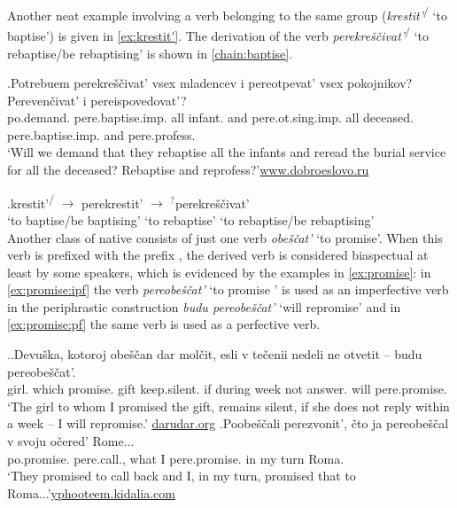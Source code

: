Another neat example involving a verb belonging to the same group (\textit{krestit'}\textsuperscript{\IPF\slash\PF} `to baptise') is given in \ref{ex:krestit'}. The derivation of the verb \textit{perekre\v{s}\v{c}ivat'}\textsuperscript{\IPF\slash\PF} `to rebaptise/be rebaptising' is shown in \ref{chain:baptise}.

\exg.\label{ex:krestit'}Potrebuem perekre\v{s}\v{c}ivat' vsex mladencev i pereotpevat' vsex pokojnikov? Pereven\v{c}ivat' i pereispovedovat'?\\
po.demand. pere.baptise.imp. all infant. and pere.ot.sing.imp. all deceased. pere.baptise.imp. and pere.profess.\\
\trans `Will we demand that they rebaptise all the infants and reread the burial service for all the deceased? Rebaptise and reprofess?'\hbox{}\hfill\hbox{\url{www.dobroeslovo.ru}}


\exg.\label{chain:baptise}krestit'\textsuperscript{\IPF\slash\PF} $\rightarrow$ perekrestit'\textsuperscript{\PF} $\rightarrow$ $^?$perekre\v{s}\v{c}ivat'\textsuperscript{\IPF}\\
{`to baptise/be baptising'} {} {`to rebaptise'} {} {`to rebaptise/be rebaptising'}\\

Another class of native  consists of just one verb \textit{obe\v{s}\v{c}at'} `to promise'. When this verb is prefixed with the  prefix , the derived verb is considered biaspectual at least by some speakers, which is evidenced by the examples in \ref{ex:promise}: in \ref{ex:promise:ipf} the verb \textit{pereobe\v{s}\v{c}at'} `to promise ' is used as an imperfective verb in the periphrastic  construction \textit{budu pereobe\v{s}\v{c}at'} `will repromise' and in \ref{ex:promise:pf} the same verb is used as a perfective verb. 

\ex.\label{ex:promise}\ag.\label{ex:promise:ipf}Devu\v{s}ka, kotoroj obe\v{s}\v{c}an dar mol\v{c}it, esli {v te\v{c}enii} nedeli ne otvetit -- budu pereobe\v{s}\v{c}at'.\\
girl. which promise. gift keep.silent. if during week not answer. {}  will pere.promise.\\
\trans `The girl to whom I promised the gift, remains silent, if she does not reply within a week -- I will repromise.'
\hbox{}\hfill\hbox{\url{darudar.org}}
\bg.\label{ex:promise:pf}Poobe\v{s}\v{c}ali perezvonit', \v{c}to ja pereobe\v{s}\v{c}al v svoju o\v{c}ered' Rome...\\
po.promise. pere.call., what I pere.promise. in my turn Roma.\\
\trans `They promised to call back and I, in my turn, promised that to Roma...'\hbox{}\hfill\hbox{\url{yphooteem.kidalia.com}}


